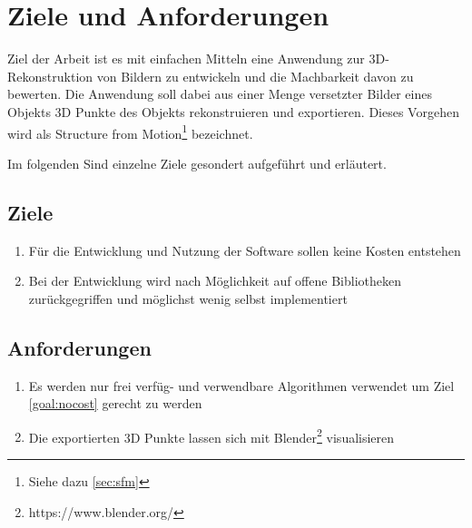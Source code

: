 
\chapter{Ziele und Anforderungen}
Ziel der Arbeit ist es mit einfachen Mitteln eine Anwendung zur 3D-Rekonstruktion von Bildern zu entwickeln und die Machbarkeit davon zu bewerten.
Die Anwendung soll dabei aus einer Menge versetzter Bilder eines Objekts 3D Punkte des Objekts rekonstruieren und exportieren.
Dieses Vorgehen wird als Structure from Motion\footnote{Siehe dazu \autoref{sec:sfm} } bezeichnet.

Im folgenden Sind einzelne Ziele gesondert aufgeführt und erläutert.

\section{Ziele}
\begin{enumerate}
\item \label{goal:nocost} Für die Entwicklung und Nutzung der Software sollen keine Kosten entstehen
\item Bei der Entwicklung wird nach Möglichkeit auf offene Bibliotheken zurückgegriffen und möglichst wenig selbst implementiert
\end{enumerate}


\section{Anforderungen}
\begin{enumerate}
\item Es werden nur frei verfüg- und verwendbare Algorithmen verwendet um Ziel \autoref{goal:nocost} gerecht zu werden
\item  Die exportierten 3D Punkte lassen sich mit Blender\footnote{https://www.blender.org/} visualisieren
\end{enumerate}
